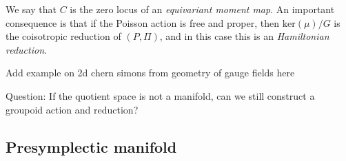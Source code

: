 We say that $C$ is the zero locus of an \textit{equivariant moment map}.
% 
An important consequence is that if the Poisson action is free and proper, then $\mathrm{ker}(\mu)/G$ is the coisotropic reduction of $(P, \Pi)$, and in this case this is an \textit{Hamiltonian reduction}.
% 
\begin{tcolorbox}
    Add example on 2d chern simons from geometry of gauge fields here
\end{tcolorbox}
% 
Question:
    If the quotient space is not a manifold, can we still construct a groupoid action and reduction?
% 
\subsection{Presymplectic manifold} %
\label{sub:presymplectic_mfd}
\label{def:presymplectic manifold}

